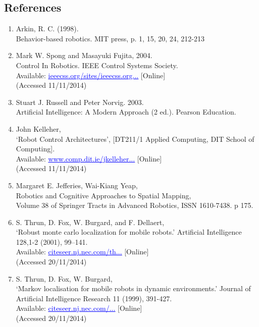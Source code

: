 \documentclass{article}
\begin{document}
\begin{multicols}{2}
\section{References}
\begin{enumerate}

\item Arkin, R. C. (1998).
\\Behavior-based robotics. MIT press, p. 1, 15, 20, 24, 212-213

\item Mark W. Spong and Masayuki Fujita, 2004.
\\Control In Robotics. IEEE Control Systems Society. \\Available: \href{ieeecss.org/sites/ieeecss.org/files/documents/IoCT-Part1-04Robotics.pdf}{\textcolor{blue}{\uline{ieeecss.org/sites/ieeecss.org...}}} [Online]
\\(Accessed 11/11/2014)

\item Stuart J. Russell and Peter Norvig. 2003.
\\Artificial Intelligence: A Modern Approach (2 ed.). Pearson Education.

\item John Kelleher,
\\‘Robot Control Architectures’,  [DT211/1 Applied Computing, DIT School of Computing].
\\Available: \href{www.comp.dit.ie/jkelleher/appliedcomputing/week8/RCA.pdf}{\textcolor{blue}{\uline{www.comp.dit.ie/jkelleher...}}} [Online]
\\(Accessed 11/11/2014)

\item Margaret E. Jefferies, Wai-Kiang Yeap,
\\Robotics and Cognitive Approaches to Spatial Mapping,
\\Volume 38 of Springer Tracts in Advanced Robotics, ISSN 1610-7438. p 175.

\item S. Thrun, D. Fox, W. Burgard, and F. Dellaert,
\\‘Robust monte carlo localization for mobile robots.’ Artificial Intelligence 128,1-2 (2001), 99–141.
\\Available: \href{citeseer.nj.nec.com/thrun01robust.html}{\textcolor{blue}{\uline{citeseer.nj.nec.com/th...}}} [Online]
\\(Accessed 20/11/2014)

\item S. Thrun, D. Fox, W. Burgard,
\\‘Markov localisation for mobile robots in dynamic environments.’ Journal of Artificial Intelligence Research 11 (1999), 391-427.
\\Available: \href{citeseer.nj.nec.com/fox99markov.html}{\textcolor{blue}{\uline{citeseer.nj.nec.com/...}}} [Online]
\\(Accessed 20/11/2014)


\end{enumerate}
\end{multicols}
\end{document}
